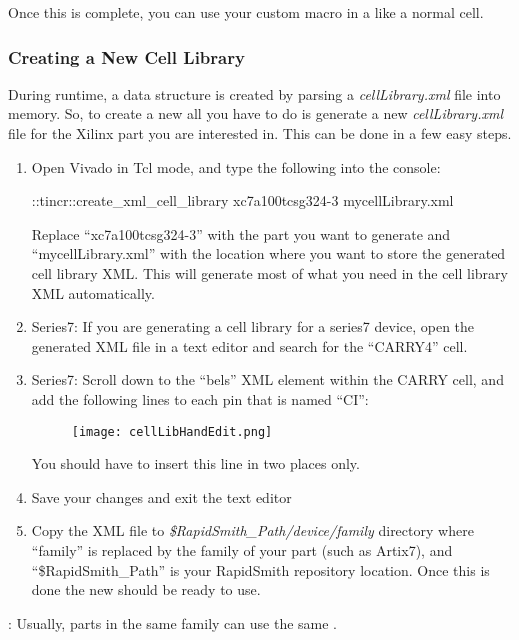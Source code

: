 \noindent
Once this is complete, you can use your custom macro in a  like
a normal cell.

\subsubsection{Creating a New Cell Library}
During runtime, a  data structure is created by parsing a
\textit{cellLibrary.xml} file into memory. So, to create a new 
all you have to do is generate a new \textit{cellLibrary.xml} file for the
Xilinx part you are interested in. This can be done in a few easy steps.

\begin{enumerate}
  \item Open Vivado in Tcl mode, and type the following into the console:
  \begin{code}
::tincr::create_xml_cell_library xc7a100tcsg324-3 mycellLibrary.xml
  \end{code}
  Replace ``xc7a100tcsg324-3'' with the part you want to generate and
  ``mycellLibrary.xml'' with the location where you want to store the generated
  cell library XML. This will generate most of what you need in the cell library
  XML automatically.
  \item Series7: If you are generating a cell library for a series7 device, open
  the generated XML file in a text editor and search for the ``CARRY4'' cell.
  \item Series7: Scroll down to the ``bels'' XML element within the CARRY cell,
  and add the following lines to each pin that is named ``CI'':
  
  \begin{figure}[H]
   \centering
   \texttt{[image: cellLibHandEdit.png]}
  \end{figure}
  
  You should have to insert this line in two places only.
  \item Save your changes and exit the text editor
  \item Copy the XML file to \textit{\$RapidSmith\_Path/device/family}
  directory where ``family'' is replaced by the family of your part (such as
  Artix7), and ``\$RapidSmith\_Path'' is your RapidSmith repository location.
  Once this is done the new  should be ready to use. 
\end{enumerate}

: Usually, parts in the same family can use the same
.

